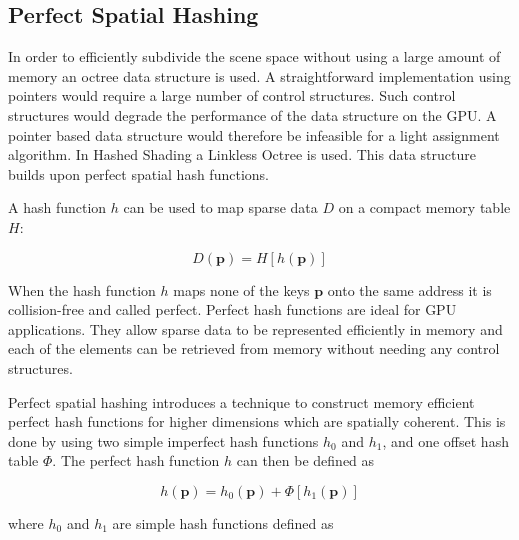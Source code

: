 
\subsection{Perfect Spatial Hashing}

In order to efficiently subdivide the scene space without using a large amount
of memory an octree data structure is used. A straightforward implementation
using pointers would require a large number of control structures. Such control
structures would degrade the performance of the data structure on the GPU\cite{Han:2011:RBD:1964179.1964184}.
A pointer based data structure would therefore be infeasible for a light assignment
algorithm. In Hashed Shading a Linkless Octree\cite{choi2009linkless} is used. This data structure
builds upon perfect spatial hash functions\cite{lefebvre2006perfect}.

A hash function $\mathit{h}$ can be used to map sparse data $D$ on a compact memory table $H$:

\begin{equation*}
  D\left(\mathbf{p}\right) = H\left[\mathit{h}\left(\mathbf{p}\right)\right]
\end{equation*}

\noindent When the hash function $\mathit{h}$ maps none of the keys $\mathbf{p}$ onto
the same address it is collision-free and called perfect. Perfect hash functions
are ideal for GPU applications. They allow sparse data to be represented efficiently in
memory and each of the elements can be retrieved from memory without needing any control
structures.

Perfect spatial hashing\cite{lefebvre2006perfect} introduces a technique
to construct memory efficient perfect hash functions for higher dimensions which are
spatially coherent. This is done by using two simple imperfect hash functions $\mathit{h}_0$
and $\mathit{h}_1$, and one offset hash table $\Phi$. The perfect hash function $\mathit{h}$
can then be defined as

\begin{equation*}
  \mathit{h}\left(\mathbf{p}\right) = \mathit{h}_0\left(\mathbf{p}\right) + \Phi\left[\mathit{h}_1\left(\mathbf{p}\right)\right]
\end{equation*}

\noindent where $\mathit{h}_0$ and $\mathit{h}_1$ are simple hash functions defined as

